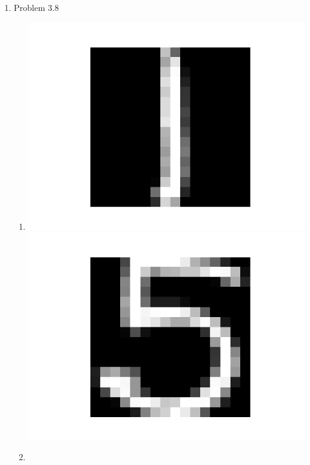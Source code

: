 \documentclass{article}
\begin{document}
\begin{enumerate}
        \item Problem 3.8
        \begin{enumerate}[label=(\alph*)]
            \item \includegraphics[scale=0.5]{images/3_8_1.png}\\ \includegraphics[scale=0.5]{images/3_8_5.png}
            \item 
        \end{enumerate}
    \end{enumerate}
\end{document}
